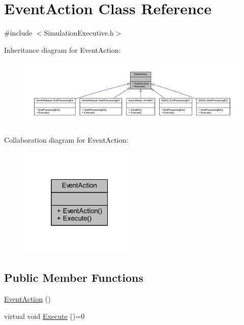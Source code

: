 \hypertarget{class_event_action}{}\section{Event\+Action Class Reference}
\label{class_event_action}


{\ttfamily \#include $<$Simulation\+Executive.\+h$>$}



Inheritance diagram for Event\+Action\+:\nopagebreak
\begin{figure}[H]
\begin{center}
\leavevmode
\includegraphics[width=350pt]{class_event_action__inherit__graph}
\end{center}
\end{figure}


Collaboration diagram for Event\+Action\+:\nopagebreak
\begin{figure}[H]
\begin{center}
\leavevmode
\includegraphics[width=163pt]{class_event_action__coll__graph}
\end{center}
\end{figure}
\subsection*{Public Member Functions}
\begin{DoxyCompactItemize}
\item 
\hyperlink{class_event_action_a9a8515b9069293b94b72a6863c48e6ba}{Event\+Action} ()
\item 
virtual void \hyperlink{class_event_action_a62b9d07abb4ca8e7c078b076a1ab1a9f}{Execute} ()=0
\end{DoxyCompactItemize}


